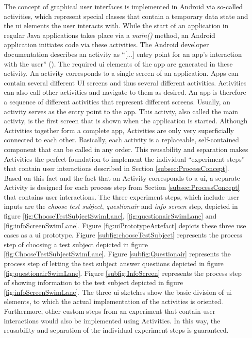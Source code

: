 The concept of graphical user interfaces is implemented in Android via so-called activities, which represent special classes that contain a temporary data state and the \ac{ui} elements the user interacts with. While the start of an application in regular Java applications takes place via a \textit{main()} method, an Android application initiates code via these activities. The Android developer documentation describes an activity as \enquote{[...] entry point for an app's interaction with the user} (\cite{Google.2023}). The required \ac{ui} elements of the app are generated in these activity. An activity corresponds to a single screen of an application. Apps can contain several different UI screens and thus several different activities. Activities can also call other activities and navigate to them as desired. An app is therefore a sequence of different activities that represent different screens. Usually, an activity serves as the entry point to the app. This activty, also called the main activty, is the first screen that is shown when the application is started. Although Activities together form a complete app, Activities are only very superficially connected to each other. Basically, each activity is a replaceable, self-contained component that can be called in any order. This reusability and separation makes Activities the perfect foundation to implement the individual \enquote{experiment steps} that contain user interactions described in Section \ref{subsec:ProcessConcept}. Based on this fact and the fact that an Activity corresponds to a \ac{ui}, a separate Activity is designed for each process step from Section \ref{subsec:ProcessConcept} that contains user interactions. The three experiment steps, which include user inputs are the \textit{choose test subject}, \textit{questionair} and \textit{info screen} step, depicted in figure \ref{fig:ChooseTestSubjectSwimLane}, \ref{fig:questionairSwimLane} and \ref{fig:infoScreenSwimLane}. Figure \ref{fig:uiPrototypeArtefact} depicts these three use cases as a \ac{ui} prototype. Figure \ref{subfig:chooseTestSubject} represents the process step of choosing a test subject depicted in figure \ref{fig:ChooseTestSubjectSwimLane}. Figure \ref{subfig:Questionair} represents the process step of letting the test subject answer questions depicted in figure \ref{fig:questionairSwimLane}. Figure \ref{subfig:InfoScreen}  represents the process step of showing information to the test subject depicted in figure \ref{fig:infoScreenSwimLane}. The three \ac{ui} sketches show the basic division of \ac{ui} elements, to which the actual implementation of the activities is oriented. Furthermore, other custom steps from an experiment that contain user interactions would also be implemented using Activities. In this way, the reusability and separation of the individual experiment steps is guaranteed.


